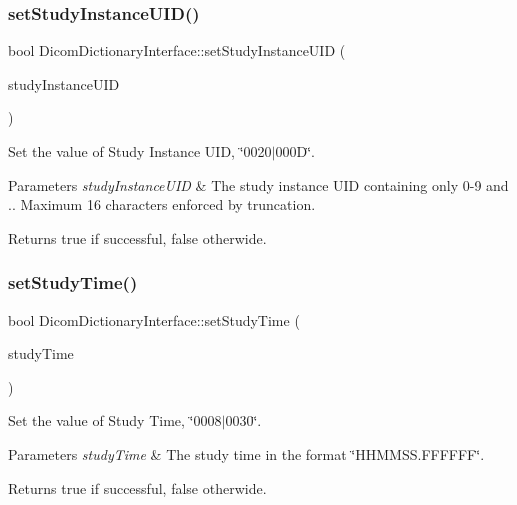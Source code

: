 \subsubsection{\texorpdfstring{set\+Study\+Instance\+U\+I\+D()}{setStudyInstanceUID()}}
{\footnotesize\ttfamily bool Dicom\+Dictionary\+Interface\+::set\+Study\+Instance\+U\+ID (\begin{DoxyParamCaption}\item[{Q\+String}]{study\+Instance\+U\+ID }\end{DoxyParamCaption})}



Set the value of Study Instance U\+ID, \char`\"{}0020$\vert$000\+D\char`\"{}. 


\begin{DoxyParams}{Parameters}
{\em study\+Instance\+U\+ID} & The study instance U\+ID containing only \textquotesingle{}0\textquotesingle{}-\/\textquotesingle{}9\textquotesingle{} and \textquotesingle{}.\textquotesingle{}. Maximum 16 characters enforced by truncation. \\
\hline
\end{DoxyParams}
\begin{DoxyReturn}{Returns}
true if successful, false otherwide. 
\end{DoxyReturn}
\mbox{\label{class_dicom_dictionary_interface_aa89d9c7cc352b77e2c79330935960954}} 
\subsubsection{\texorpdfstring{set\+Study\+Time()}{setStudyTime()}}
{\footnotesize\ttfamily bool Dicom\+Dictionary\+Interface\+::set\+Study\+Time (\begin{DoxyParamCaption}\item[{Q\+String}]{study\+Time }\end{DoxyParamCaption})}



Set the value of Study Time, \char`\"{}0008$\vert$0030\char`\"{}. 


\begin{DoxyParams}{Parameters}
{\em study\+Time} & The study time in the format \char`\"{}\+H\+H\+M\+M\+S\+S.\+F\+F\+F\+F\+F\+F\char`\"{}. \\
\hline
\end{DoxyParams}
\begin{DoxyReturn}{Returns}
true if successful, false otherwide. 
\end{DoxyReturn}
\mbox{\label{class_dicom_dictionary_interface_a6e1bd34428c4b354f997a64f9e854e44}} 
